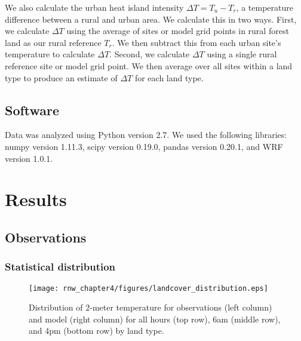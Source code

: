 We also calculate the urban heat island intensity $\Delta T = T_u - T_r$, a temperature difference between a rural and urban area. We calculate this in two ways. First, we calculate $\Delta T$ using the average of sites or model grid points in rural forest land as our rural reference $T_r$. We then subtract this from each urban site's temperature to calculate $\Delta T$. 
Second, we calculate $\Delta T$ using a single rural reference site or model grid point. We then average over all sites within a land type to produce an estimate of $\Delta T$ for each land type. 

\subsection{Software}
Data was analyzed using Python version 2.7. We used the following libraries: numpy version 1.11.3, scipy version 0.19.0, pandas version 0.20.1, and WRF version 1.0.1. 

\section{Results}\label{sec:results} 
\subsection{Observations}
\label{sec:results_obs}
\subsubsection{Statistical distribution}

\begin{figure}
\centering
\texttt{[image: rnw\_chapter4/figures/landcover\_distribution.eps]}
\caption{Distribution of 2-meter temperature for observations (left column) and model (right column) for all hours (top row), 6am (middle row), and 4pm (bottom row) by land type. }
\label{fig:hist}
\end{figure}

